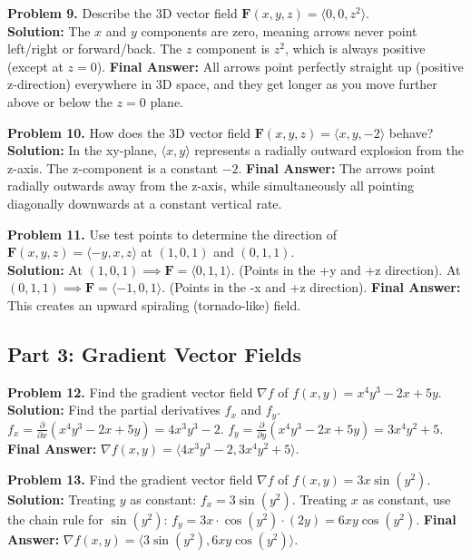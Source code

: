 \documentclass[11pt]{article}
\begin{document}
\vspace{0.3cm}
\textbf{Problem 9.} Describe the 3D vector field $\mathbf{F}(x, y, z) = \langle 0, 0, z^2 \rangle$. \\
\textbf{Solution:}
The $x$ and $y$ components are zero, meaning arrows never point left/right or forward/back. The $z$ component is $z^2$, which is always positive (except at $z=0$).
\textbf{Final Answer:} All arrows point perfectly straight up (positive z-direction) everywhere in 3D space, and they get longer as you move further above or below the $z=0$ plane.

\vspace{0.3cm}
\textbf{Problem 10.} How does the 3D vector field $\mathbf{F}(x,y,z) = \langle x, y, -2 \rangle$ behave? \\
\textbf{Solution:}
In the xy-plane, $\langle x, y \rangle$ represents a radially outward explosion from the z-axis. The z-component is a constant $-2$. 
\textbf{Final Answer:} The arrows point radially outwards away from the z-axis, while simultaneously all pointing diagonally downwards at a constant vertical rate.

\vspace{0.3cm}
\textbf{Problem 11.} Use test points to determine the direction of $\mathbf{F}(x,y,z) = \langle -y, x, z \rangle$ at $(1, 0, 1)$ and $(0, 1, 1)$. \\
\textbf{Solution:}
At $(1, 0, 1) \implies \mathbf{F} = \langle 0, 1, 1 \rangle$. (Points in the +y and +z direction).
At $(0, 1, 1) \implies \mathbf{F} = \langle -1, 0, 1 \rangle$. (Points in the -x and +z direction).
\textbf{Final Answer:} This creates an upward spiraling (tornado-like) field.

\subsection*{Part 3: Gradient Vector Fields}

\textbf{Problem 12.} Find the gradient vector field $\nabla f$ of $f(x, y) = x^4 y^3 - 2x + 5y$. \\
\textbf{Solution:}
Find the partial derivatives $f_x$ and $f_y$.
$f_x = \frac{\partial}{\partial x}(x^4 y^3 - 2x + 5y) = 4x^3 y^3 - 2$.
$f_y = \frac{\partial}{\partial y}(x^4 y^3 - 2x + 5y) = 3x^4 y^2 + 5$.
\textbf{Final Answer:} $\nabla f(x, y) = \langle 4x^3 y^3 - 2, 3x^4 y^2 + 5 \rangle$.

\vspace{0.3cm}
\textbf{Problem 13.} Find the gradient vector field $\nabla f$ of $f(x, y) = 3x \sin(y^2)$. \\
\textbf{Solution:}
Treating $y$ as constant: $f_x = 3 \sin(y^2)$.
Treating $x$ as constant, use the chain rule for $\sin(y^2)$: $f_y = 3x \cdot \cos(y^2) \cdot (2y) = 6xy \cos(y^2)$.
\textbf{Final Answer:} $\nabla f(x, y) = \langle 3 \sin(y^2), 6xy \cos(y^2) \rangle$.
\end{document}

